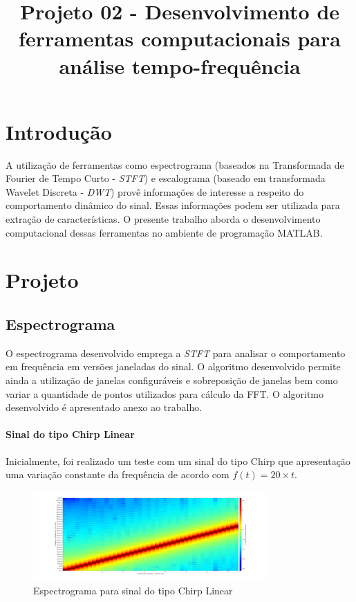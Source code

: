 \documentclass{article}
\title{Projeto 02 - Desenvolvimento de ferramentas computacionais para análise tempo-frequência}
\begin{document}
\maketitle





\section{Introdução}\label{sec:intro}
A utilização de ferramentas como espectrograma (baseados na Transformada de Fourier de Tempo Curto - \textit{STFT})  e escalograma (baseado em transformada Wavelet Discreta - \textit{DWT}) provê informações de interesse a respeito do comportamento dinâmico do sinal. Essas informações podem ser utilizada para extração de características. O presente trabalho aborda o desenvolvimento computacional dessas ferramentas no ambiente de programação MATLAB.

\section{Projeto}
\subsection{Espectrograma}
O espectrograma desenvolvido emprega a \textit{STFT} para analisar o comportamento em frequência em versões janeladas do sinal. O algoritmo desenvolvido permite ainda a utilização de janelas configuráveis e sobreposição de janelas bem como variar a quantidade de pontos utilizados para cálculo da FFT. O algoritmo desenvolvido é apresentado anexo ao trabalho.

\paragraph*{Sinal do tipo Chirp Linear}
Inicialmente, foi realizado um teste com um sinal do tipo Chirp que apresentação uma variação constante da frequência de acordo com $f(t) = 20 \times t$.
\begin{figure}[H]
	\begin{center}
		\includegraphics[width=3.5in]{Figures/linear_chirp_spectrogram.png}
		\caption{Espectrograma para sinal do tipo Chirp Linear}
		\label{fig:chirp}
	\end{center}
\end{figure}  
\end{document}
